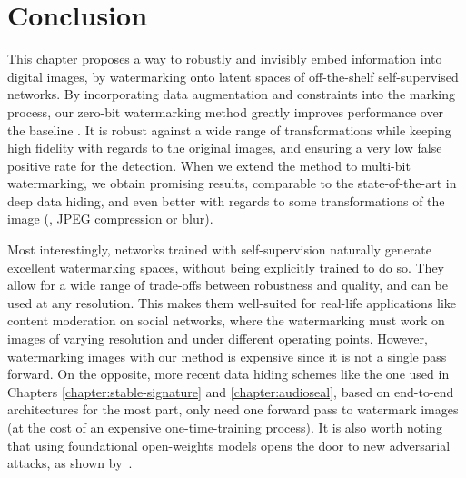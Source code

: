 


\section{Conclusion}

This chapter proposes a way to robustly and invisibly embed information into digital images, by watermarking onto latent spaces of off-the-shelf self-supervised networks. 
By incorporating data augmentation and constraints into the marking process, our zero-bit watermarking method greatly improves performance over the baseline \citep{vukotic2020classification}.
It is robust against a wide range of transformations while keeping high fidelity with regards to the original images, and ensuring a very low false positive rate for the detection.
When we extend the method to multi-bit watermarking, we obtain promising results, comparable to the state-of-the-art in deep data hiding, and even better with regards to some transformations of the image (\eg, JPEG compression or blur).

Most interestingly, networks trained with self-supervision naturally generate excellent watermarking spaces, without being explicitly trained to do so. 
They allow for a wide range of trade-offs between robustness and quality, and can be used at any resolution.
This makes them well-suited for real-life applications like content moderation on social networks, where the watermarking must work on images of varying resolution and under different operating points.
However, watermarking images with our method is expensive since it is not a single pass forward. 
On the opposite, more recent data hiding schemes like the one used in Chapters \ref{chapter:stable-signature} and \ref{chapter:audioseal}, based on end-to-end architectures for the most part, only need one forward pass to watermark images (at the cost of an expensive one-time-training process).
It is also worth noting that using foundational open-weights models opens the door to new adversarial attacks, as shown by~\citep{kinakh2024evaluation}.
